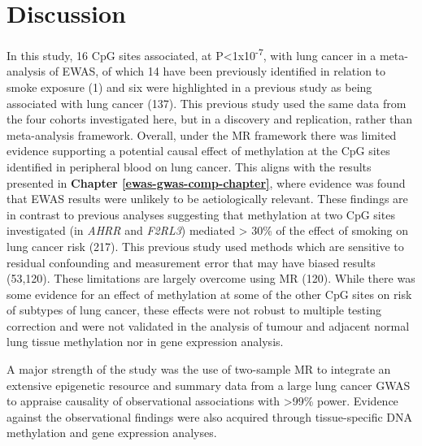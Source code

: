 \documentclass[11pt,twoside]{bristolthesis}
\begin{document}
\hypertarget{discussion-07}{%
\section{Discussion}\label{discussion-07}}

In this study, 16 CpG sites associated, at P\textless1x10\textsuperscript{-7}, with lung cancer in a meta-analysis of EWAS, of which 14 have been previously identified in relation to smoke exposure (1) and six were highlighted in a previous study as being associated with lung cancer (137). This previous study used the same data from the four cohorts investigated here, but in a discovery and replication, rather than meta-analysis framework. Overall, under the MR framework there was limited evidence supporting a potential causal effect of methylation at the CpG sites identified in peripheral blood on lung cancer. This aligns with the results presented in \textbf{Chapter \ref{ewas-gwas-comp-chapter}}, where evidence was found that EWAS results were unlikely to be aetiologically relevant. These findings are in contrast to previous analyses suggesting that methylation at two CpG sites investigated (in \emph{AHRR} and \emph{F2RL3}) mediated \textgreater{} 30\% of the effect of smoking on lung cancer risk (217). This previous study used methods which are sensitive to residual confounding and measurement error that may have biased results (53,120). These limitations are largely overcome using MR (120). While there was some evidence for an effect of methylation at some of the other CpG sites on risk of subtypes of lung cancer, these effects were not robust to multiple testing correction and were not validated in the analysis of tumour and adjacent normal lung tissue methylation nor in gene expression analysis.

A major strength of the study was the use of two-sample MR to integrate an extensive epigenetic resource and summary data from a large lung cancer GWAS to appraise causality of observational associations with \textgreater99\% power. Evidence against the observational findings were also acquired through tissue-specific DNA methylation and gene expression analyses.
\end{document}
